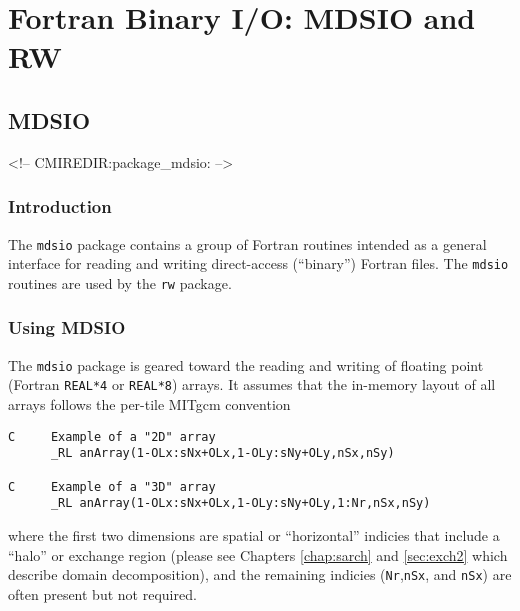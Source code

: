 

\section{Fortran Binary I/O: MDSIO and RW}
\label{sec:mdsio_and_rw}


\subsection{MDSIO}
\label{sec:pkg:mdsio}
\begin{rawhtml}
<!-- CMIREDIR:package_mdsio: -->
\end{rawhtml}
\label{sec:pkg:rw}

\subsubsection{Introduction}
The \texttt{mdsio} package contains a group of Fortran routines
intended as a general interface for reading and writing direct-access
(``binary'') Fortran files.  The \texttt{mdsio} routines are used by
the \texttt{rw} package.

\subsubsection{Using MDSIO}
The \texttt{mdsio} package is geared toward the reading and writing of
floating point (Fortran \texttt{REAL*4} or \texttt{REAL*8}) arrays.
It assumes that the in-memory layout of all arrays follows the per-tile
MITgcm convention
\begin{verbatim}
C     Example of a "2D" array
      _RL anArray(1-OLx:sNx+OLx,1-OLy:sNy+OLy,nSx,nSy)

C     Example of a "3D" array
      _RL anArray(1-OLx:sNx+OLx,1-OLy:sNy+OLy,1:Nr,nSx,nSy)
\end{verbatim}
where the first two dimensions are spatial or ``horizontal'' indicies
that include a ``halo'' or exchange region (please see
Chapters \ref{chap:sarch} and \ref{sec:exch2} which describe domain
decomposition), and the remaining indicies (\texttt{Nr},\texttt{nSx},
and \texttt{nSx}) are often present but not required.

